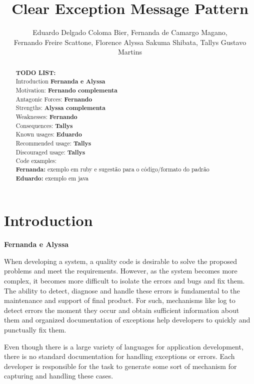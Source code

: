 \documentclass[12pt]{article}
\title{Clear Exception Message Pattern}
\author{Eduardo Delgado Coloma Bier\inst{1}, Fernanda de Camargo Magano\inst{1}, \\ Fernando Freire Scattone\inst{1},
  Florence Alyssa Sakuma Shibata\inst{1}, Tallys Gustavo Martins\inst{1} }
\begin{document}
 

\maketitle

\begin{abstract}

\textbf{TODO LIST:} \\
Introduction  \textbf{Fernanda e Alyssa} \\
Motivation: \textbf{Fernando complementa} \\
Antagonic Forces:  \textbf{Fernando}  \\
Strengths:  \textbf{Alyssa complementa} \\
Weaknesses: \textbf{Fernando} \\
Consequences: \textbf{Tallys} \\
Known usages: \textbf{Eduardo}  \\
Recommended usage: \textbf{Tallys}  \\
Discouraged usage: \textbf{Tallys} \\

Code examples: \\
\textbf{ Fernanda:} exemplo em ruby e sugestão para o código/formato do padrão\\
\textbf{ Eduardo:} exemplo em java
 

 
  
  
\end{abstract}
        

\section{Introduction}  \textbf{Fernanda e Alyssa}

When developing a system, a quality code is desirable to solve the proposed problems and meet the requirements. However, as the system becomes more complex, it becomes more difficult to isolate the errors and bugs and fix them. The ability to detect, diagnose and handle these errors is fundamental to the maintenance and support of final product. For such, mechanisms like log to detect errors the moment they occur and obtain sufficient information about them and organized documentation of exceptions help developers to quickly and punctually fix them.

Even though there is a large variety of languages for application development, there is no standard documentation for handling exceptions or errors. Each developer is responsible for the task to generate some sort of mechanism for capturing and handling these cases.
\end{document}
